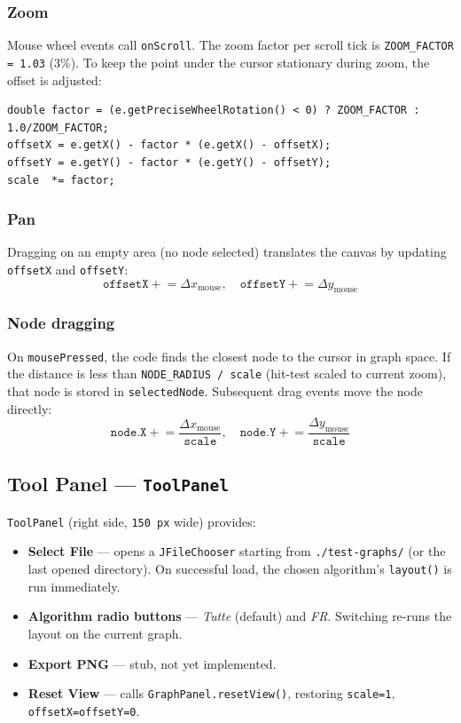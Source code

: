 \documentclass[12pt,a4paper]{article}
\begin{document}
\subsubsection*{Zoom}

Mouse wheel events call \texttt{onScroll}. The zoom factor per scroll
tick is \texttt{ZOOM\_FACTOR = 1.03} (3\%). To keep the point under the
cursor stationary during zoom, the offset is adjusted:

\begin{lstlisting}[caption={Zoom centred on cursor}]
double factor = (e.getPreciseWheelRotation() < 0) ? ZOOM_FACTOR : 1.0/ZOOM_FACTOR;
offsetX = e.getX() - factor * (e.getX() - offsetX);
offsetY = e.getY() - factor * (e.getY() - offsetY);
scale  *= factor;
\end{lstlisting}

\subsubsection*{Pan}

Dragging on an empty area (no node selected) translates the canvas by
updating \texttt{offsetX} and \texttt{offsetY}:
\[
  \texttt{offsetX} \mathrel{+}= \Delta x_{\text{mouse}}, \quad
  \texttt{offsetY} \mathrel{+}= \Delta y_{\text{mouse}}
\]

\subsubsection*{Node dragging}

On \texttt{mousePressed}, the code finds the closest node to the cursor
in graph space. If the distance is less than \texttt{NODE\_RADIUS / scale}
(hit-test scaled to current zoom), that node is stored in
\texttt{selectedNode}. Subsequent drag events move the node directly:
\[
  \texttt{node.X} \mathrel{+}= \frac{\Delta x_{\text{mouse}}}{\texttt{scale}}, \quad
  \texttt{node.Y} \mathrel{+}= \frac{\Delta y_{\text{mouse}}}{\texttt{scale}}
\]

\subsection{Tool Panel — \texttt{ToolPanel}}

\texttt{ToolPanel} (right side, \texttt{150 px} wide) provides:

\begin{itemize}
  \item \textbf{Select File} — opens a \texttt{JFileChooser} starting from
        \texttt{./test-graphs/} (or the last opened directory). On
        successful load, the chosen algorithm's \texttt{layout()} is run
        immediately.
  \item \textbf{Algorithm radio buttons} — \textit{Tutte} (default) and
        \textit{FR}. Switching re-runs the layout on the current graph.
  \item \textbf{Export PNG} — stub, not yet implemented.
  \item \textbf{Reset View} — calls \texttt{GraphPanel.resetView()},
        restoring \texttt{scale=1}, \texttt{offsetX=offsetY=0}.
\end{itemize}
\end{document}
